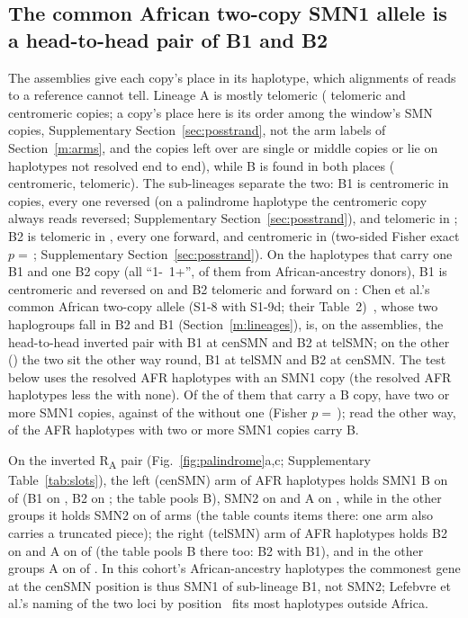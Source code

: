 \documentclass[10pt]{article}
\newcommand{\RU}[1]{R\textsubscript{#1}}%
\begin{document}
\subsection{The common African two-copy SMN1 allele is a head-to-head pair of B1 and B2}\label{m:cen}
The assemblies give each copy's place in its haplotype, which alignments of reads to a reference cannot tell. Lineage A is mostly telomeric (\linATel{} telomeric and \linACen{} centromeric copies; a copy's place here is its order among the window's SMN copies, Supplementary Section~\ref{sec:posstrand}, not the arm labels of Section~\ref{m:arms}, and the copies left over are single or middle copies or lie on haplotypes not resolved end to end), while B is found in both places (\linBCen{} centromeric,
\linBTel{} telomeric). The sub-lineages separate the two: B1 is centromeric in \linBoneCen{} copies, every one reversed (on a palindrome haplotype the centromeric copy always reads reversed; Supplementary Section~\ref{sec:posstrand}),
and telomeric in \linBoneTel; B2 is telomeric in \linBtwoTel, every one forward, and centromeric in \linBtwoCen{}
(two-sided Fisher exact $p=$\,\linSubPpos; Supplementary Section~\ref{sec:posstrand}). On the \linMixHaps{}
haplotypes that carry one B1 and one B2 copy (all \linMixHaps{} ``1-~1+'', \linMixAfr{} of them from African-ancestry donors), B1 is
centromeric and reversed on \linMixBoneCenRev{} and B2 telomeric and forward on \linMixBtwoTelFwd: Chen et al.'s common African two-copy allele (S1-8 with S1-9d; their Table~2)~\cite{chen2023}, whose two haplogroups fall in B2 and B1 (Section~\ref{m:lineages}), is, on the assemblies, the head-to-head inverted pair
with B1 at cenSMN and B2 at telSMN; on the other \linMixSwap{} (\linMixSwapNames) the two sit the other way round, B1 at telSMN and B2 at cenSMN. The test below uses the \mOneAFRN{} resolved AFR haplotypes with an SMN1 copy (the \dosAfrHaps{} resolved AFR haplotypes less the \dosAfrNoSmnOne{} with none). Of the
\ldTestBN{} of them that carry a B copy, \ldTestBMulti{} have two or more SMN1 copies,
against \ldTestNoBMulti{} of the \ldTestNoBN{} without one (Fisher $p=$\,\ldTestP); read the other way,
\ldTestBMulti{} of the \ldTestMultiN{} AFR haplotypes with two or more SMN1 copies carry B.

On the inverted \RU{A} pair (Fig.~\ref{fig:palindrome}a,c; Supplementary Table~\ref{tab:slots}), the left (cenSMN) arm of AFR
haplotypes holds SMN1 B on \slLAfrB{} of \slLAfr{} (B1 on \slLAfrBone{}, B2 on \slLAfrBtwo; the table pools B), SMN2 on \slLAfrTwo{} and A on \slLAfrA, while in the other groups it
holds SMN2 on \slLOthTwo{} of \slLOth{} arms (the table counts \slLOthItems{} items there: one arm also carries a truncated piece); the right (telSMN) arm of AFR haplotypes holds B2 on \slRAfrBtwo{} and A on \slRAfrA{} of \slRAfr{} (the table pools B there too: \slRAfrBtwo{} B2 with \slRAfrBone{} B1), and in the other groups A on \slROthA{} of \slROth. In this cohort's African-ancestry haplotypes
the commonest gene at the cenSMN position is thus SMN1 of sub-lineage B1, not SMN2; Lefebvre et al.'s naming of the two
loci by position~\cite{lefebvre1995} fits most haplotypes outside Africa.
\end{document}
